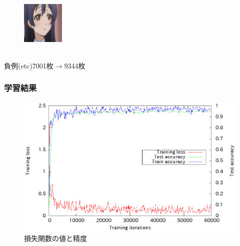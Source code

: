 \documentclass[dvipdfmx,11pt,notheorems]{beamer}
\theoremstyle{definition}
\begin{document}
\begin{frame}
\begin{figure}[t]
\begin{minipage}{0.17\hsize}
  \\
 \end{minipage}
 \begin{minipage}{0.17\hsize}
  \centering
   \\
  \centering
  \includegraphics[width=20mm,bb=0 0 200 200]{./fig/png/faces/umi.png}\\
  \\
 \end{minipage}
 \end{figure}
負例(etc)7001枚$\rightarrow$9344枚
\end{frame}

\begin{frame}\frametitle{学習結果}
 \begin{figure}[ht]
 \centering
 \includegraphics[scale=1.0]{fig/eps/result_train_test_lovelive_full.eps}
 \caption{損失関数の値と精度}
\end{figure}
\end{frame}
\end{document}
